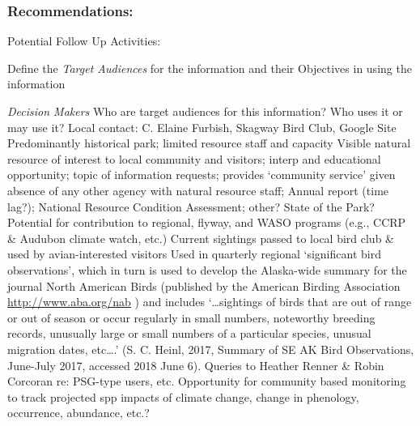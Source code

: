 \documentclass[]{article}
\begin{document}
\subsubsection{Recommendations:}\label{recommendations}

Potential Follow Up Activities:

Define the \emph{Target Audiences} for the information and their
Objectives in using the information

\emph{Decision Makers} Who are target audiences for this information?
Who uses it or may use it? Local contact: C. Elaine Furbish, Skagway
Bird Club, Google Site Predominantly historical park; limited resource
staff and capacity Visible natural resource of interest to local
community and visitors; interp and educational opportunity; topic of
information requests; provides `community service' given absence of any
other agency with natural resource staff; Annual report (time lag?);
National Resource Condition Assessment; other? State of the Park?
Potential for contribution to regional, flyway, and WASO programs (e.g.,
CCRP \& Audubon climate watch, etc.) Current sightings passed to local
bird club \& used by avian-interested visitors Used in quarterly
regional `significant bird observations', which in turn is used to
develop the Alaska-wide summary for the journal North American Birds
(published by the American Birding Association
\url{http://www.aba.org/nab} ) and includes `\ldots{}sightings of birds
that are out of range or out of season or occur regularly in small
numbers, noteworthy breeding records, unusually large or small numbers
of a particular species, unusual migration dates, etc\ldots{}.' (S. C.
Heinl, 2017, Summary of SE AK Bird Observations, June-July 2017,
accessed 2018 June 6). Queries to Heather Renner \& Robin Corcoran re:
PSG-type users, etc. Opportunity for community based monitoring to track
projected spp impacts of climate change, change in phenology,
occurrence, abundance, etc.?
\end{document}
